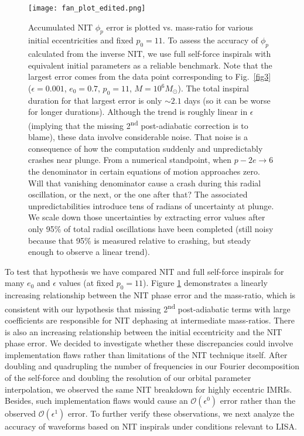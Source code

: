 \documentclass[aps,prd,twocolumn,showpacs,notitlepage,eqsecnum,
superscriptaddress,nofootinbib]{revtex4-1}
\begin{document}
\begin{figure}
\centering
  \vspace{0.2cm}
  \texttt{[image: fan\_plot\_edited.png]} 
    \caption{Accumulated NIT $\phi_p$ error is plotted vs. mass-ratio for various initial eccentricities and fixed $p_0 = 11$. To assess the accuracy of $\phi_p$ calculated from the inverse NIT, we use full self-force inspirals with equivalent initial parameters as a reliable benchmark. Note that the largest error comes from the data point corresponding to Fig.~\ref{fig3} ($\epsilon = 0.001$, $e_0 = 0.7$, $p_0 = 11$, $M=10^6 M_\odot$). The total inspiral duration for that largest error is only $\sim 2.1$ days (so it can be worse for longer durations). Although the trend is roughly linear in $\epsilon$ (implying that the missing 2\textsuperscript{nd} post-adiabatic correction is to blame), these data involve considerable noise. That noise is a consequence of how the computation suddenly and unpredictably crashes near plunge. From a numerical standpoint, when $p-2e\rightarrow 6$ the denominator in certain equations of motion approaches zero. Will that vanishing denominator cause a crash during this radial oscillation, or the next, or the one after that? The associated unpredictabilities introduce tens of radians of uncertainty at plunge. We scale down those uncertainties by extracting error values after only 95\% of total radial oscillations have been completed (still noisy because that 95\% is measured relative to crashing, but steady enough to observe a linear trend).}
  \label{fig9}
\end{figure}

To test that hypothesis we have compared NIT and full self-force inspirals for many $e_0$ and $\epsilon$ values (at fixed $p_0=11$). Figure \ref{fig9} demonstrates a linearly increasing relationship between the NIT phase error and the mass-ratio, which is consistent with our hypothesis that missing 2\textsuperscript{nd} post-adiabatic terms with large coefficients are responsible for NIT dephasing at intermediate mass-ratios. There is also an increasing relationship between the initial eccentricity and the NIT phase error. We decided to investigate whether these discrepancies could involve implementation flaws rather than limitations of the NIT technique itself. After doubling and quadrupling the number of frequencies in our Fourier decomposition of the self-force and doubling the resolution of our orbital parameter interpolation, we observed the same NIT breakdown for highly eccentric IMRIs. Besides, such implementation flaws would cause an $\mathcal{O}(\epsilon^0)$ error rather than the observed $\mathcal{O}(\epsilon^1)$ error. To further verify these observations, we next analyze the accuracy of waveforms based on NIT inspirals under conditions relevant to LISA. 
\end{document}
